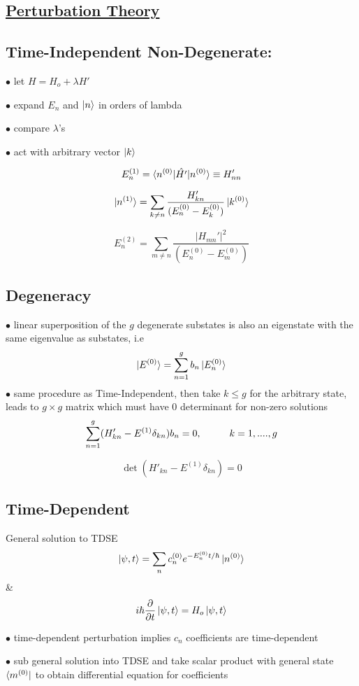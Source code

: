 \documentclass[table,cmyk]{article}
\begin{document}
\begin{longtable}
\section*{\underline{Perturbation Theory}}

\subsection*{Time-Independent Non-Degenerate:}

$\bullet$ let $H = H_o + \lambda H'$

$\bullet$ expand $E_n$ and $\ket{n}$ in orders of lambda

$\bullet$ compare $\lambda$'s

$\bullet$ act with arbitrary vector $\ket{k}$

\[E_n^{(1)} = \braket{n^{(0)}|\hat{H'}|n^{(0)}} \equiv H_{nn}'\]

\[ \ket{n^{(1)}} = \sum_{k\ne n} \frac{H_{kn}'}{(E_n^{(0)}-E_k^{(0)})}\ket{k^{(0)}}\]

\[E_n^{(2)} = \sum_{m\ne n} \frac{|H_{mn}'|^2}{(E_n^{(0)}-E_m^{(0)})}\]

\subsection*{Degeneracy}

$\bullet$ linear superposition of the $g$ degenerate substates is also an eigenstate with the same eigenvalue as substates, i.e
\[\ket{E^{(0)}} = \sum_{n=1}^{g} b_n\ket{E_n^{(0)}}\]
$\bullet$ same procedure as Time-Independent, then take $k \le g$ for the arbitrary state, leads to $g\times g$ matrix which must have $0$ determinant for non-zero solutions
\[ \sum_{n=1}^{g} (H'_{kn} - E^{(1)}\delta_{kn})b_n=0, \text{\hspace{1cm}} k = 1,....,g\]

\[\det(H'_{kn} - E^{(1)}\delta_{kn}) = 0\]

\subsection*{Time-Dependent}
General solution to TDSE
\[\ket{\psi, t} = \sum_{n } c_n^{(0)} e^{-E_n^{(0)}t/\hbar}\ket{n^{(0)}}\]
&
\[i\hbar\frac{\partial}{\partial t}\ket{\psi, t} = H_o \ket{\psi, t}\]

$\bullet$ time-dependent perturbation implies $c_n$ coefficients are time-dependent

$\bullet$ sub general solution into TDSE and take scalar product with general state $\bra{m^{(0)}}$ to obtain differential equation for coefficients


\end{longtable}
\end{document}
